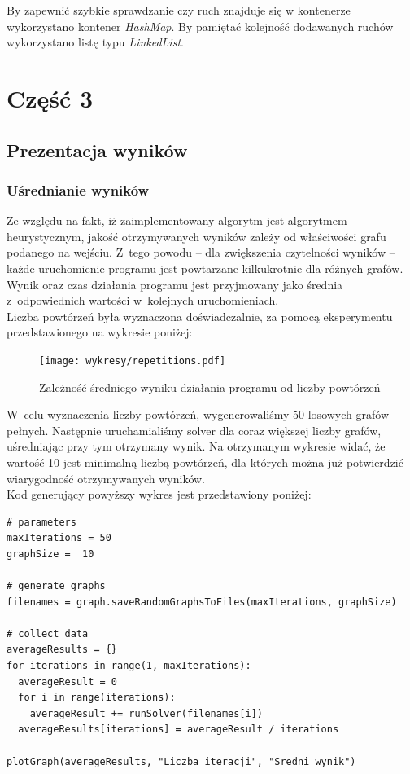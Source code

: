 \documentclass[11pt,a4paper]{article}
\begin{document}
By zapewnić szybkie sprawdzanie czy ruch znajduje się w kontenerze wykorzystano kontener \textit{HashMap}. By pamiętać kolejność dodawanych ruchów wykorzystano listę typu \textit{LinkedList}.

\newpage
\section{Część 3}
\subsection{Prezentacja wyników}
\subsubsection{Uśrednianie wyników}
Ze względu na fakt, iż zaimplementowany algorytm jest algorytmem heurystycznym, jakość otrzymywanych wyników zależy od właściwości grafu podanego na wejściu. Z~tego powodu -- dla zwiększenia czytelności wyników -- każde uruchomienie programu jest powtarzane kilkukrotnie dla różnych grafów. Wynik oraz czas działania programu jest przyjmowany jako średnia z~odpowiednich wartości w~kolejnych uruchomieniach.\\

Liczba powtórzeń była wyznaczona doświadczalnie, za pomocą eksperymentu przedstawionego na wykresie poniżej:
\begin{figure}[H]
\texttt{[image: wykresy/repetitions.pdf]}
\caption{Zależność średniego wyniku działania programu od liczby powtórzeń}
\end{figure}

W~celu wyznaczenia liczby powtórzeń, wygenerowaliśmy 50 losowych grafów pełnych. Następnie uruchamialiśmy solver dla coraz większej liczby grafów, uśredniając przy tym otrzymany wynik. Na otrzymanym wykresie widać, że wartość 10 jest minimalną liczbą powtórzeń, dla których można już potwierdzić wiarygodność otrzymywanych wyników.\\

Kod generujący powyższy wykres jest przedstawiony poniżej:

\newpage
\begin{lstlisting}[caption = Fragment kodu programu w języku Python generującego powyższy wykres]
# parameters
maxIterations = 50
graphSize =  10

# generate graphs
filenames = graph.saveRandomGraphsToFiles(maxIterations, graphSize)

# collect data
averageResults = {}
for iterations in range(1, maxIterations):
  averageResult = 0
  for i in range(iterations):
    averageResult += runSolver(filenames[i])
  averageResults[iterations] = averageResult / iterations

plotGraph(averageResults, "Liczba iteracji", "Sredni wynik")
\end{lstlisting}
\end{document}
